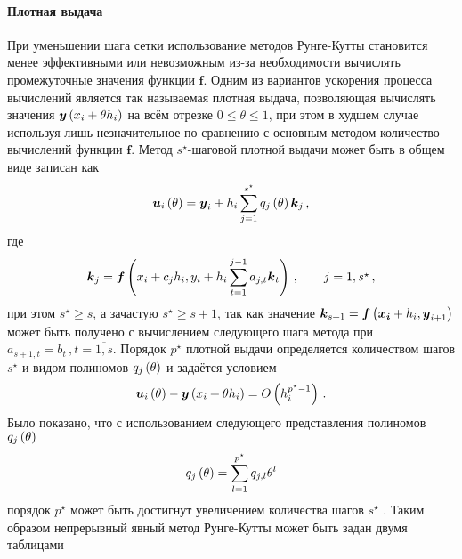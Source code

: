 \documentclass[../document.tex]{subfiles}
\begin{document}
            \paragraph{Плотная выдача}
                \par При уменьшении шага сетки использование методов Рунге-Кутты становится менее эффективными или невозможным из-за необходимости вычислять промежуточные значения функции $\boldsymbol{f}$. Одним из вариантов ускорения процесса вычислений является так называемая плотная выдача, позволяющая вычислять значения $\boldsymbol{y}\left(x_i+\theta h_i\right)$ на всём отрезке $0\leqslant\theta\leqslant1$, при этом в худшем случае используя лишь незначительное по сравнению с основным методом количество вычислений функции $\boldsymbol{f}$. Метод $s^{\star}$-шаговой плотной выдачи может быть в общем виде записан как 
                \begin{equation}
                    \boldsymbol{u}_i\left(\theta\right)=\boldsymbol{y}_i+h_i\sum\limits_{j=1}^{s^{\star}}q_j\left(\theta\right)\boldsymbol{k}_j\,,
                \end{equation}
                где 
                \begin{equation}
                    \boldsymbol{k}_j=\boldsymbol{f}\left(x_i+c_jh_i,y_i+h_i\sum\limits_{t=1}^{j-1}a_{j,t}\boldsymbol{k}_t\right)\,,\qquad j=\overline{1,s^{\star}}\,,
                \end{equation}
                при этом $s^{\star}\geqslant s$, а зачастую $s^{\star}\geqslant s+1$, так как значение $\boldsymbol{k}_{s+1}=\boldsymbol{f}\left(\boldsymbol{x_i}+h_i,\boldsymbol{y}_{i+1}\right)$ может быть получено с вычислением следующего шага метода при $a_{s+1,t}=b_{t}\,,t=\overline{1,s}$. Порядок $p^{\star}$ плотной выдачи определяется количеством шагов $s^{\star}$ и видом полиномов $q_j\left(\theta\right)$ и задаётся условием
                \begin{equation}
                    \boldsymbol{u}_i\left(\theta\right)-\boldsymbol{y}\left(x_i+\theta h_i\right)=O\left(h_i^{p^{\star}-1}\right)\,.
                \end{equation}
                Было показано, что с использованием следующего представления полиномов $q_j\left(\theta\right)$
                \begin{equation}
                    q_j\left(\theta\right)=\sum\limits_{l=1}^{p^{\star}}q_{j,l}\theta^l
                \end{equation}
                порядок $p^{\star}$ может быть достигнут увеличением количества шагов $s^{\star}$ \cite{dense}. Таким образом непрерывный явный метод Рунге-Кутты может быть задан двумя таблицами
\end{document}
